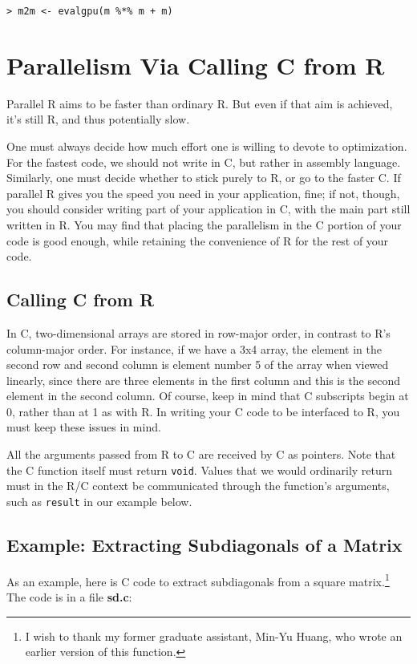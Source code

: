 \begin{lstlisting}
> m2m <- evalgpu(m %*% m + m)
\end{lstlisting}

\section{Parallelism Via Calling C from R}
\label{cfromr}

Parallel R aims to be faster than ordinary R.  But even if that aim is
achieved, it's still R, and thus potentially slow.

One must always decide how much effort one is willing to devote to
optimization.  For the fastest code, we should not write in C, but
rather in assembly language.  Similarly, one must decide whether to
stick purely to R, or go to the faster C.  If parallel R gives you the
speed you need in your application, fine; if not, though, you should
consider writing part of your application in C, with the main part still
written in R.  You may find that placing the parallelism in the C
portion of your code is good enough, while retaining the convenience of
R for the rest of your code.

\subsection{Calling C from R}

In C, two-dimensional arrays are stored in row-major order, in contrast
to R's column-major order.   For instance, if we have a 3x4 array, the
element in the second row and second column is element number 5 of the
array when viewed linearly, since there are three elements in the first
column and this is the second element in the second column.  Of course,
keep in mind that C subscripts begin at 0, rather than at 1 as with R.
In writing your C code to be interfaced to R, you must keep these issues
in mind.

All the arguments passed from R to C are received by C as pointers.
Note that the C function itself must return {\tt void}.  Values that we
would ordinarily return must in the R/C context be communicated through the
function's arguments, such as {\tt result} in our example below.

\subsection{Example:  Extracting Subdiagonals of a Matrix}

As an example, here is C code to extract subdiagonals from a square
matrix.\footnote{I wish to thank my former graduate assistant, Min-Yu
Huang, who wrote an earlier version of this function.} The code is in a
file {\bf sd.c}:

